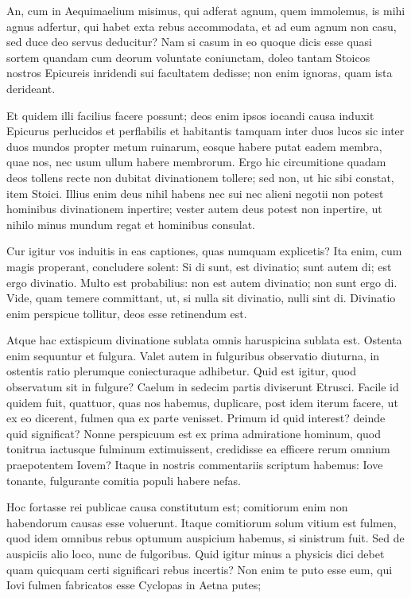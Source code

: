  An, cum in Aequimaelium misimus, qui adferat agnum, quem immolemus, is mihi agnus adfertur, qui habet exta rebus accommodata, et ad eum agnum non casu, sed duce deo servus deducitur? Nam si casum in eo quoque dicis esse quasi sortem quandam cum deorum voluntate coniunctam, doleo tantam Stoicos nostros Epicureis inridendi sui facultatem dedisse; non enim ignoras, quam ista derideant.

 Et quidem illi facilius facere possunt; deos enim ipsos iocandi causa induxit Epicurus perlucidos et perflabilis et habitantis tamquam inter duos lucos sic inter duos mundos propter metum ruinarum, eosque habere putat eadem membra, quae nos, nec usum ullum habere membrorum. Ergo hic circumitione quadam deos tollens recte non dubitat divinationem tollere; sed non, ut hic sibi constat, item Stoici. Illius enim deus nihil habens nec sui nec alieni negotii non potest hominibus divinationem inpertire; vester autem deus potest non inpertire, ut nihilo minus mundum regat et hominibus consulat.

 Cur igitur vos induitis in eas captiones, quas numquam explicetis? Ita enim, cum magis properant, concludere solent: Si di sunt, est divinatio; sunt autem di; est ergo divinatio. Multo est probabilius: non est autem divinatio; non sunt ergo di. Vide, quam temere committant, ut, si nulla sit divinatio, nulli sint di. Divinatio enim perspicue tollitur, deos esse retinendum est.

 Atque hac extispicum divinatione sublata omnis haruspicina sublata est. Ostenta enim sequuntur et fulgura. Valet autem in fulguribus observatio diuturna, in ostentis ratio plerumque coniecturaque adhibetur. Quid est igitur, quod observatum sit in fulgure? Caelum in sedecim partis diviserunt Etrusci. Facile id quidem fuit, quattuor, quas nos habemus, duplicare, post idem iterum facere, ut ex eo dicerent, fulmen qua ex parte venisset. Primum id quid interest? deinde quid significat? Nonne perspicuum est ex prima admiratione hominum, quod tonitrua iactusque fulminum extimuissent, credidisse ea efficere rerum omnium praepotentem Iovem? Itaque in nostris commentariis scriptum habemus: Iove tonante, fulgurante comitia populi habere nefas.

 Hoc fortasse rei publicae causa constitutum est; comitiorum enim non habendorum causas esse voluerunt. Itaque comitiorum solum vitium est fulmen, quod idem omnibus rebus optumum auspicium habemus, si sinistrum fuit. Sed de auspiciis alio loco, nunc de fulgoribus. Quid igitur minus a physicis dici debet quam quicquam certi significari rebus incertis? Non enim te puto esse eum, qui Iovi fulmen fabricatos esse Cyclopas in Aetna putes;

